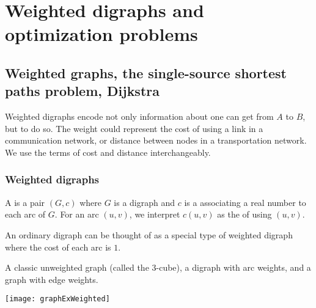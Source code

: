 \part{Weighted digraphs and optimization problems}
\label{ch:weighted}

\chapter{Weighted graphs, the single-source shortest paths problem, Dijkstra} %
Weighted digraphs encode not only information about  one can get from $A$ to $B$,
but  to do so.
The weight could represent the cost of using a link in a communication network, 
or distance between nodes in a transportation network. 
We use the terms of cost and distance interchangeably.


\section{Weighted digraphs} \label{sec:weighted}
\begin{Definition}
A  is a pair $(G, c)$ where $G$ is a digraph
and $c$ is a  associating a real number to each arc of $G$. 
For an arc $(u,v)$, we interpret  $c(u, v)$ as the  of using $(u, v)$.
\end{Definition}

An ordinary digraph can be thought of as a special type of weighted digraph 
where the cost of each arc is $1$. 

\begin{Boxample} \label{ex:graphExWeighted}
A classic unweighted graph (called the $3$-cube), a digraph with arc weights, 
and a graph with edge weights.
\begin{center}
 \texttt{[image: graphExWeighted]}
\end{center}
\end{Boxample}

